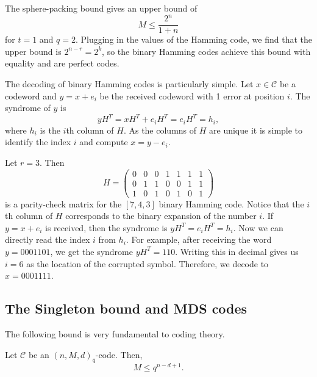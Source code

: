 \documentclass[../main.tex]{subfiles}
\begin{document}
The sphere-packing bound gives an upper bound of
\begin{equation*}
    M \leq \frac{2^n}{1 + n}
\end{equation*}
for $t = 1$ and $q = 2$. Plugging in the values of the Hamming code, we find that the upper bound is $2^{n - r} = 2^k$, so the binary Hamming codes achieve this bound with equality and are perfect codes.

The decoding of binary Hamming codes is particularly simple. Let $x \in \mathcal{C}$ be a codeword and $y = x + e_i$ be the received codeword with 1 error at position $i$. The syndrome of $y$ is
\begin{equation*}
    yH^T = xH^T + e_iH^T = e_iH^T = h_i,
\end{equation*}
where $h_i$ is the $i$th column of $H$. As the columns of $H$ are unique it is simple to identify the index $i$ and compute $x = y - e_i$.

\begin{example}
Let $r = 3$. Then
\begin{equation*}
    H = \begin{pmatrix}
    0 & 0 & 0 & 1 & 1 & 1 & 1 \\
    0 & 1 & 1 & 0 & 0 & 1 & 1 \\
    1 & 0 & 1 & 0 & 1 & 0 & 1
    \end{pmatrix}
\end{equation*}
is a parity-check matrix for the $[7, 4, 3]$ binary Hamming code. Notice that the $i$th column of $H$ corresponds to the binary expansion of the number $i$. If $y = x + e_i$ is received, then the syndrome is $yH^T = e_iH^T = h_i$. Now we can directly read the index $i$ from $h_i$. For example, after receiving the word $y = 0001101$, we get the syndrome $yH^T = 110$. Writing this in decimal gives us $i = 6$ as the location of the corrupted symbol. Therefore, we decode to $x = 0001111$.
\end{example}

\subsection{The Singleton bound and MDS codes}

The following bound is very fundamental to coding theory.

\begin{theorem}\label{thm:Singleton_bound}
Let $\mathcal{C}$ be an $(n, M, d)_q$-code. Then,
\begin{equation*}
    M \leq q^{n - d + 1}.
\end{equation*}
\end{theorem}
\end{document}

